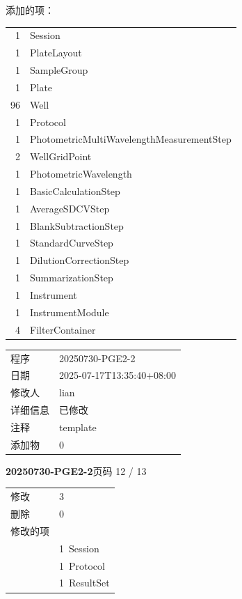 \documentclass[UTF8,10pt,a4paper,fontset=fandol]{ctexart}
\newcommand{\fieldvalue}[1]{#1}
\begin{document}
\begin{center}
\begin{center}
\medskip
添加的项：

\begin{tabular}{rl}
1 & Session\\
1 & PlateLayout\\
1 & SampleGroup\\
1 & Plate\\
96 & Well\\
1 & Protocol\\
1 & PhotometricMultiWavelengthMeasurementStep\\
2 & WellGridPoint\\
1 & PhotometricWavelength\\
1 & BasicCalculationStep\\
1 & AverageSDCVStep\\
1 & BlankSubtractionStep\\
1 & StandardCurveStep\\
1 & DilutionCorrectionStep\\
1 & SummarizationStep\\
1 & Instrument\\
1 & InstrumentModule\\
4 & FilterContainer\\
\end{tabular}

\medskip

\begin{tabular}{ll}
程序 &
\fieldvalue{20250730-PGE2-2}\\
日期 &
\fieldvalue{2025-07-17T13:35:40+08:00}\\
修改人 &
\fieldvalue{lian}\\
详细信息 &
\fieldvalue{已修改}\\
注释 &
\fieldvalue{template}\\
添加物 &
\fieldvalue{0}
\end{tabular}

\newpage

\noindent\textbf{20250730-PGE2-2}\hfill 页码 12 / 13

\medskip

\begin{tabular}{@{}ll@{}}
修改 &
\fieldvalue{3}\\
删除 &
\fieldvalue{0}\\
修改的项 &\\
&
\fieldvalue{1\ Session}\\
&
\fieldvalue{1\ Protocol}\\
&
\fieldvalue{1\ ResultSet}\\
\end{tabular}


\end{center}
\end{center}
\end{document}
